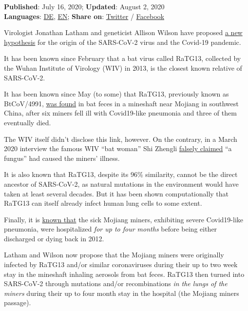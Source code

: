\textbf{Published}: July 16, 2020; \textbf{Updated}: August 2, 2020\\
\textbf{Languages}:
\href{https://swprs.org/ursprung-des-covid-19-virus-die-mojiang-minenarbeiter-hypothese/}{DE},
\href{https://swprs.org/covid-19-virus-origin-the-mojiang-miners-passage-hypothesis/}{EN};
\textbf{Share on}:
\href{https://twitter.com/intent/tweet?url=https://swprs.org/covid-19-virus-origin-the-mojiang-miners-passage-hypothesis/}{Twitter}
/
\href{https://www.facebook.com/share.php?u=https://swprs.org/covid-19-virus-origin-the-mojiang-miners-passage-hypothesis/}{Facebook}

Virologist Jonathan Latham and geneticist Allison Wilson have proposed
\href{https://www.independentsciencenews.org/commentaries/a-proposed-origin-for-sars-cov-2-and-the-covid-19-pandemic/}{a
new hypothesis} for the origin of the SARS-CoV-2 virus and the Covid-19
pandemic.

It has been known since February that a bat virus called RaTG13,
collected by the Wuhan Institute of Virology (WIV) in 2013, is the
closest known relative of SARS-CoV-2.

It has been known since May (to some) that RaTG13, previously known as
BtCoV/4991,
\href{https://www.thetimes.co.uk/article/seven-year-covid-trail-revealed-l5vxt7jqp}{was
found} in bat feces in a mineshaft near Mojiang in southwest China,
after six miners fell ill with Covid19-like pneumonia and three of them
eventually died.

The WIV itself didn't disclose this link, however. On the contrary, in a
March 2020 interview the famous WIV ``bat woman'' Shi Zhengli
\href{https://www.scientificamerican.com/article/how-chinas-bat-woman-hunted-down-viruses-from-sars-to-the-new-coronavirus1/}{falsely
claimed} ``a fungus'' had caused the miners' illness.

It is also known that RaTG13, despite its 96\% similarity, cannot be the
direct ancestor of SARS-CoV-2, as natural mutations in the environment
would have taken at least several decades. But it has been shown
computationally that RaTG13 can itself already infect human lung cells
to some extent.

Finally, it is
\href{https://www.documentcloud.org/documents/6981198-Analysis-of-Six-Patients-With-Unknown-Viruses.html}{known
that} the sick Mojiang miners, exhibiting severe Covid19-like pneumonia,
were hospitalized \emph{for up to four months} before being either
discharged or dying back in 2012.

Latham and Wilson now propose that the Mojiang miners were originally
infected by RaTG13 and/or similar coronaviruses during their up to two
week stay in the mineshaft inhaling aerosols from bat feces. RaTG13 then
turned into SARS-CoV-2 through mutations and/or recombinations \emph{in
the lungs of the miners} during their up to four month stay in the
hospital (the Mojiang miners passage).

